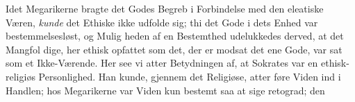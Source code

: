 \documentclass[12pt,a4paper]{book}
\newcommand{\gk}[1]{\textit{#1}}
\begin{document}
Idet Megarikerne bragte det Godes Begreb i Forbindelse
med den eleatiske Væren, \emph{kunde} det Ethiske ikke udfolde sig;
thi det Gode i dets Enhed var bestemmelsesløst, og Mulig\-%
heden af en Bestemthed udelukkedes derved, at det Mangfol\-%
dige, her ethisk opfattet som det, der er modsat det ene Gode,
var sat som et Ikke-Værende. Her see vi atter Betydningen
af, at Sokrates var en ethisk-religiøs Personlighed. Han kunde,
gjennem det Religiøse, atter føre Viden ind i Handlen; hos
Megarikerne var Viden kun bestemt saa at sige retograd; den
\end{document}
